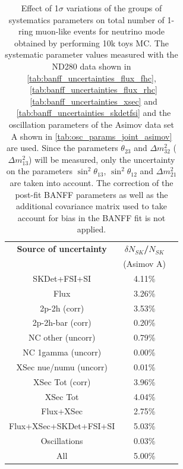 

\begin{table}[htb]
\centering
\begin{tabular}{| c | c | c |}
\hline
  {\bf Source of uncertainty}    & \multicolumn{1}{c|}{{\bf ${\delta}N_{SK}$/$N_{SK}$}}\\
                                 & \multicolumn{1}{c|}{(Asimov A)}\\

\hline
\hline  SKDet+FSI+SI                   & 4.11\%                        \\
\hline
\hline
  Flux                           & 3.26\%                        \\
\hline
\hline
  2p-2h (corr)                     & 3.53\%                        \\
  2p-2h-bar (corr)                  & 0.20\%                        \\
  NC other (uncorr)              & 0.79\%                        \\
  NC 1gamma (uncorr)             & 0.00\%                        \\
  XSec nue/numu (uncorr)                 & 0.01\%                        \\
\hline
  XSec Tot (corr)                  & 3.96\%                        \\
  XSec Tot                       & 4.04\%                        \\
\hline
\hline
  Flux+XSec                      & 2.75\%                        \\
\hline
\hline
  Flux+XSec+SKDet+FSI+SI         & 5.03\%                        \\
\hline
\hline
  Oscillations                   & 0.03\%                        \\
\hline
\hline
  All                            & 5.00\%                        \\
\hline
\hline

\end{tabular}
\caption{
 Effect of 1$\sigma$ variations of the groups of systematics parameters on total number of
 1-ring muon-like events for neutrino mode obtained by performing 10k toys MC.
The systematic parameter values measured with the ND280 data 
shown in 
\cref{tab:banff_uncertainties_flux_fhc},
~\ref{tab:banff_uncertainties_flux_rhc}
~\ref{tab:banff_uncertainties_xsec}
and
~\ref{tab:banff_uncertainties_skdetfsi}
and the oscillation parameters of the Asimov data set A shown in \cref{tab:osc_params_joint_asimov}
are used.
Since the parameters $\theta_{23}$ and $\Delta m^2_{32}$ ($\Delta m^2_{13}$)
will be measured,
only the uncertainty on the parameters 
$\sin^2 \theta_{13}$,
$\sin^2 \theta_{12}$
and 
$\Delta m^2_{21}$ 
are taken into account.
The correction of the post-fit BANFF parameters as well as the additional covariance matrix 
used to take account for bias in the BANFF fit is not applied.
}                                                                                                                                                                                          
\label{tab:nsk_systematic_table_summary_joint_asimov_A_fhc_mulike_NoFluxBias}
\end{table}
